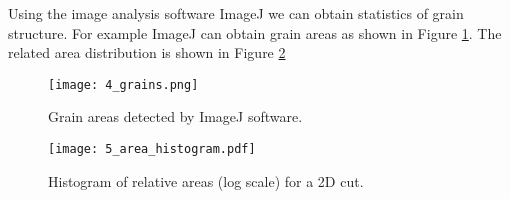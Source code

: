 Using the image analysis software ImageJ \cite{schneider2012nih} we can obtain statistics of grain structure. For example ImageJ can obtain grain areas as shown in Figure \ref{fig:4_grains}. The related area distribution is shown in  Figure \ref{fig:5_area_histogram}

\begin{figure}[h]
    \centering
    \texttt{[image: 4\_grains.png]}
    \caption{Grain areas detected by ImageJ software.}
    \label{fig:4_grains}
\end{figure}

\begin{figure}[h]
    \centering
    \texttt{[image: 5\_area\_histogram.pdf]}
    \caption{Histogram of relative areas (log scale) for a 2D cut.}
    \label{fig:5_area_histogram}
\end{figure}
